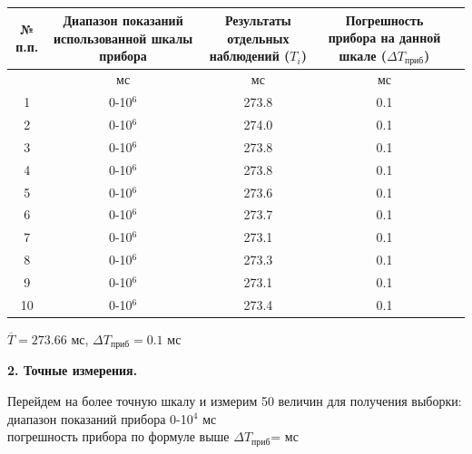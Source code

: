 {\centering
{}
\label{tabl:1}
\begin{tabular}{|c|c|c|c|c|}
\hline
\begin{minipage}{7mm}
    № п.п. 
\end{minipage}&
\begin{minipage}{5cm}
    Диапазон показаний использованной шкалы прибора
\end{minipage} &
\begin{minipage}{5cm}
    Результаты отдельных наблюдений ($T_i$)
\end{minipage} &
\begin{minipage}{5cm}
    Погрешность прибора на данной шкале ($\Delta T_{\text{приб}}$)
\end{minipage}\\
\hline
{}&мс&мс&мс\\
\hline
1 & 0-10\(^6\) & 273.8 & 0.1 \\
2 & 0-10\(^6\) & 274.0 & 0.1 \\
3 & 0-10\(^6\) & 273.8 & 0.1 \\
4 & 0-10\(^6\) & 273.8 & 0.1 \\
5 & 0-10\(^6\) & 273.6 & 0.1 \\
6 & 0-10\(^6\) & 273.7 & 0.1 \\
7 & 0-10\(^6\) & 273.1 & 0.1 \\
8 & 0-10\(^6\) & 273.3 & 0.1 \\
9 & 0-10\(^6\) & 273.1 & 0.1 \\
10& 0-10\(^6\) & 273.4 & 0.1 \\
\hline
\end{tabular}
\par} 

\FloatBarrier 

\vspace{0.5cm}
\noindent \(\overline{T} = 273.66\) мс, \(\Delta T_{\text{приб}} = 0.1\) мс

\vspace{0.5cm}
\noindent\textbf{2. Точные измерения.}\\

\vspace{0.3}

Перейдем на более точную шкалу и измерим 50 величин для получения выборки:
\\

диапазон показаний прибора 0-10\(^4\) мс
\\

погрешность прибора по формуле выше $\Delta T_{\text{приб}}$= мс

